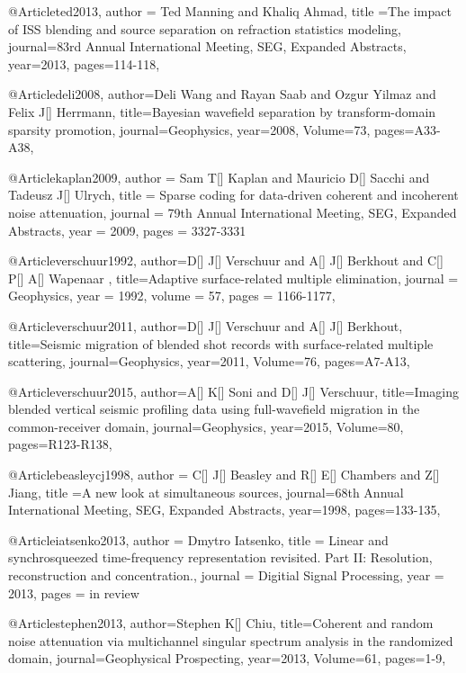 {@Article{ted2013,
  author = {Ted Manning and Khaliq Ahmad},
  title ={The impact of ISS blending and source separation on refraction statistics modeling},
  journal={83rd Annual International Meeting, SEG, Expanded Abstracts},
  year=2013,
  pages={114-118},
}

@Article{deli2008,
  author={Deli Wang and Rayan Saab and Ozgur Yilmaz and Felix J[] Herrmann},
  title={Bayesian wavefield separation by transform-domain sparsity promotion},
  journal={Geophysics},
  year=2008,
  Volume=73,
  pages={A33-A38},
}


@Article{kaplan2009,
  author = 	 {Sam T[] Kaplan and Mauricio D[] Sacchi and Tadeusz J[] Ulrych},
  title = 	 {Sparse coding for data-driven coherent and incoherent noise attenuation},
  journal = 	 {79th Annual International Meeting, SEG, Expanded Abstracts},
  year = 	 2009,
  pages =	 {3327-3331}
}



@Article{verschuur1992,
  author={D[] J[] Verschuur and A[] J[] Berkhout and C[] P[] A[] Wapenaar },
  title={Adaptive surface-related multiple elimination},
  journal = 	 {Geophysics},
  year = 	 1992,
  volume =	 57,
  pages =	 {1166-1177},
}

@Article{verschuur2011,
  author={D[] J[] Verschuur and A[] J[] Berkhout},
  title={Seismic migration of blended shot records with surface-related multiple scattering},
  journal={Geophysics},
  year=2011,
  Volume=76,
  pages={A7-A13},
}

@Article{verschuur2015,
  author={A[] K[] Soni and D[] J[] Verschuur},
  title={Imaging blended vertical seismic profiling data using full-wavefield migration in the common-receiver domain},
  journal={Geophysics},
  year=2015,
  Volume=80,
  pages={R123-R138},
}


@Article{beasleycj1998,
  author = {C[] J[] Beasley and R[] E[] Chambers and Z[] Jiang},
  title ={A new look at simultaneous sources},
  journal={68th Annual International Meeting, SEG, Expanded Abstracts},
  year=1998,
  pages={133-135},
}

@Article{iatsenko2013,
  author = 	 {Dmytro Iatsenko},
  title = 	 {Linear and synchrosqueezed time-frequency representation revisited. Part II: Resolution, reconstruction and concentration.},
  journal = 	 {Digitial Signal Processing},
  year = 	 2013,
  pages =	 {in review}
}


@Article{stephen2013,
  author={Stephen K[] Chiu},
  title={Coherent and random noise attenuation via multichannel singular spectrum analysis in the randomized domain},
  journal={Geophysical Prospecting},
  year=2013,
  Volume=61,
  pages={1-9},
}

}
